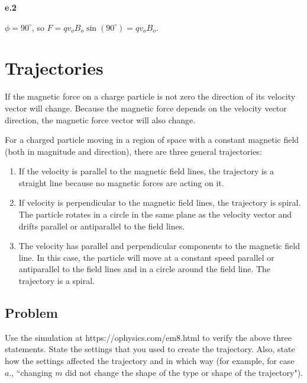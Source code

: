 \documentclass{article}
\begin{document}
\vskip 48pt
\fi
\ifsolutions\else
\vskip 48pt
\fi

{\bf e.2}

\ifsolutions
$\phi=90^{\circ}$, so $F = qv_oB_o\sin(90^{\circ})=qv_oB_o$.
\else

\newpage
\fi
\ifsolutions\else
\newpage
\fi

\section{Trajectories}

If the magnetic force on a charge particle is not zero the direction of its velocity vector will change. Because the magnetic force depends on the velocity vector direction, the magnetic force vector will also change.

For a charged particle moving in a region of space with a constant magnetic field (both in magnitude and direction), there are three general trajectories:

\begin{enumerate}

  \item If the velocity is parallel to the magnetic field lines, the trajectory is a straight line because no magnetic forces are acting on it.

  \item If velocity is perpendicular to the magnetic field lines, the trajectory is spiral. The particle rotates in a circle in the same plane as the velocity vector and drifts parallel or antiparallel to the field lines.

  \item The velocity has parallel and perpendicular components to the magnetic field line. In this case, the particle will move at a constant speed parallel or antiparallel to the field lines and in a circle around the field line. The trajectory is a spiral.

\end{enumerate}

\subsection{Problem}

Use the simulation at https://ophysics.com/em8.html to verify the above three statements. State the settings that you used to create the trajectory. Also, state how the settings affected the trajectory and in which way (for example, for case $a.$, ``changing $m$ did not change the shape of the type or shape of the trajectory"). 
\end{document}
